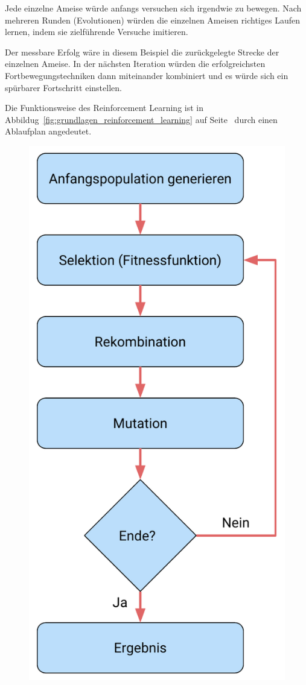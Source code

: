 Jede einzelne Ameise würde anfangs versuchen sich irgendwie zu bewegen. Nach mehreren Runden (Evolutionen) würden die
einzelnen Ameisen richtiges Laufen lernen, indem sie zielführende Versuche imitieren.

Der messbare Erfolg wäre in diesem Beispiel die zurückgelegte Strecke der einzelnen Ameise. In der nächsten Iteration
würden die erfolgreichsten Fortbewegungstechniken dann miteinander kombiniert und es würde sich ein spürbarer
Fortschritt einstellen.

Die Funktionsweise des Reinforcement Learning ist in Abbildug~\ref{fig:grundlagen_reinforcement_learning} auf
Seite~\pageref{fig:grundlagen_reinforcement_learning} durch einen Ablaufplan angedeutet.

\begin{figure}[h]
    \centering
    \includegraphics[scale=0.55]{images/kapitel_2/reinforcement_learning.pdf}

\end{figure}
